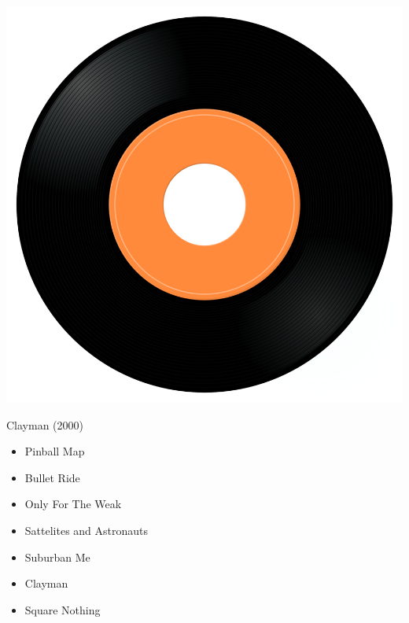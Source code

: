 \begin{minipage}[t]{0.25\textwidth}\vspace{0pt}
\captionsetup{type=figure}
\includegraphics[width=\textwidth]{Images/cover.png}
\caption*{Clayman (2000)}
\end{minipage}
\begin{minipage}[t]{0.25\textwidth}\vspace{0pt}
\begin{itemize}[nosep,leftmargin=1em,labelwidth=*,align=left]
	\setlength{\itemsep}{0pt}
	\item Pinball Map
	\item Bullet Ride
	\item Only For The Weak
	\item Sattelites and Astronauts
	\item Suburban Me
	\item Clayman
	\item Square Nothing
\end{itemize}
\end{minipage}
